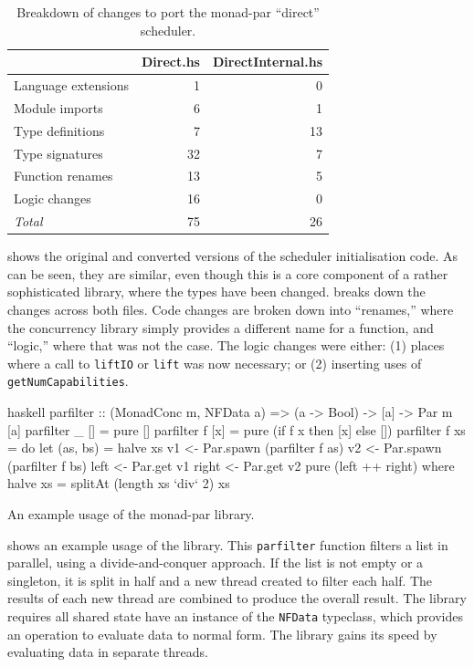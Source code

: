 \begin{table}
  \centering
  \begin{tabular}{lrr} \toprule
    & Direct.hs & DirectInternal.hs \\ \midrule
    Language extensions & 1 & 0 \\
    Module imports & 6 & 1 \\
    Type definitions & 7 & 13 \\
    Type signatures & 32 & 7 \\
    Function renames & 13 & 5 \\
    Logic changes & 16 & 0 \\ \midrule
    \emph{Total} & 75 & 26 \\ \bottomrule
  \end{tabular}
  \caption{Breakdown of changes to port the monad-par ``direct'' scheduler.}\label{tbl:parmonad_diff}
\end{table}

 shows the original and converted versions of the
scheduler initialisation code.  As can be seen, they are similar, even
though this is a core component of a rather sophisticated library,
where the types have been changed.   breaks
down the changes across both files.  Code changes are broken down into
``renames,'' where the concurrency library simply provides a different
name for a function, and ``logic,'' where that was not the case.  The
logic changes were either: (1) places where a call to \verb|liftIO| or
\verb|lift| was now necessary; or (2) inserting uses of
\verb|getNumCapabilities|.

\begin{listing}
\centering
\begin{cminted}{haskell}
parfilter :: (MonadConc m, NFData a) => (a -> Bool) -> [a] -> Par m [a]
parfilter _ []  = pure []
parfilter f [x] = pure (if f x then [x] else [])
parfilter f xs  = do
    let (as, bs) = halve xs
    v1 <- Par.spawn (parfilter f as)
    v2 <- Par.spawn (parfilter f bs)
    left  <- Par.get v1
    right <- Par.get v2
    pure (left ++ right)
  where
    halve xs = splitAt (length xs `div` 2) xs
\end{cminted}
\caption{An example usage of the monad-par library.}\label{lst:parmonad_example1}
\end{listing}

 shows an example usage of the library.
This \verb|parfilter| function filters a list in parallel, using a
divide-and-conquer approach.  If the list is not empty or a singleton,
it is split in half and a new thread created to filter each half.  The
results of each new thread are combined to produce the overall result.
The library requires all shared state have an instance of the
\verb|NFData| typeclass, which provides an operation to evaluate data
to normal form.  The library gains its speed by evaluating data in
separate threads.

